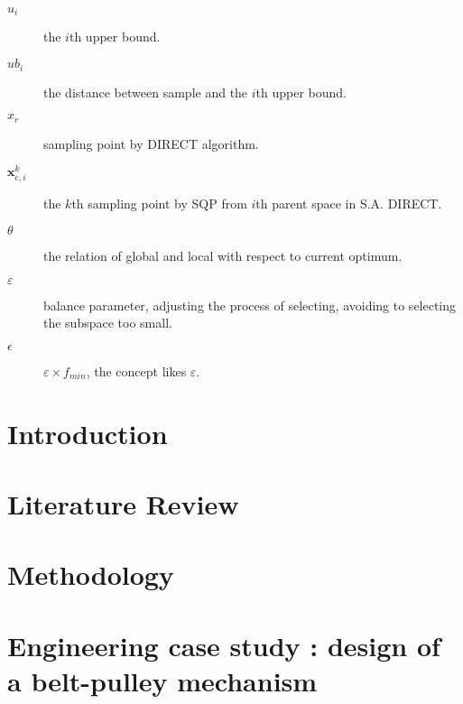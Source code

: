 \documentclass[a4paper,10pt]{article}
\renewcommand{\vec}{\mathbf} %
\begin{document}
\begin{description}
\item[$u_i$]   the $i$th upper bound.
\item[$ub_i$]   the distance between sample and the $i$th upper bound.
\item[$x_r$] sampling point by DIRECT algorithm. 
\item[$\vec{x}_{\mathrm{c},i}^{k}$] the $k$th sampling point by SQP from $i$th parent space in S.A. DIRECT.
\item[$\theta$] the relation of global and local with respect to current optimum.
\item[$\varepsilon$] balance parameter, adjusting the process of selecting, avoiding to selecting the subspace too small.
\item[$\epsilon$] $\varepsilon \times f_{min}$,  the concept likes $\varepsilon$.
\end{description}
\newpage

\section{Introduction}

\section{Literature Review}

\section{Methodology}


\section{Engineering case study : design of a belt-pulley mechanism}



\end{document}
